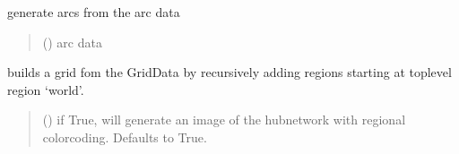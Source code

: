 \documentclass[letterpaper,10pt,english]{sphinxmanual}
\begin{document}
\begin{fulllineitems}
\begin{fulllineitems}
\end{fulllineitems}


\begin{fulllineitems}
\label{\detokenize{src.models.hydrogen.network.grid:src.models.hydrogen.network.grid.Grid.arc_generation}}
\pysigstartsignatures
\pysiglinewithargsret
{}
{}
{}
\pysigstopsignatures
\sphinxAtStartPar
generate arcs from the arc data
\begin{quote}\begin{description}
\sphinxAtStartPar
{} () \textendash{} arc data

\end{description}\end{quote}

\end{fulllineitems}


\begin{fulllineitems}
\label{\detokenize{src.models.hydrogen.network.grid:src.models.hydrogen.network.grid.Grid.build_grid}}
\pysigstartsignatures
\pysiglinewithargsret
{}
{}
{}
\pysigstopsignatures
\sphinxAtStartPar
builds a grid fom the GridData by recursively adding regions starting at top\sphinxhyphen{}level region
‘world’.
\begin{quote}\begin{description}
\sphinxAtStartPar
{} (\sphinxstyleliteralemphasis{\sphinxupquote{, }}) \textendash{} if True, will generate an image of the hub\sphinxhyphen{}network with regional color\sphinxhyphen{}coding. Defaults to True.

\end{description}\end{quote}


\end{fulllineitems}
\end{fulllineitems}
\end{document}
